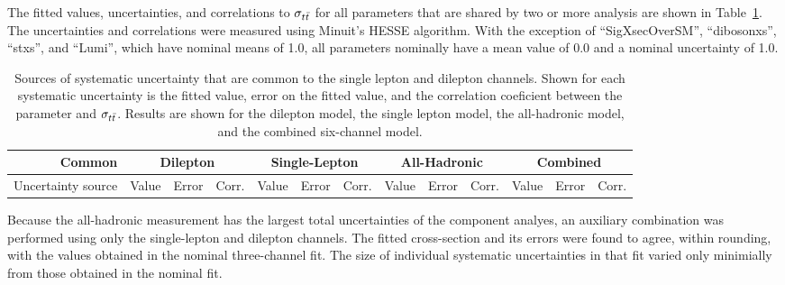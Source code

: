 The fitted values, uncertainties, and correlations to $\sigma_{ t\bar{t} }$ for all parameters that are shared by two or more analysis are shown in Table~\ref{tab:commonFittedParams}.
The uncertainties and correlations were measured using Minuit's HESSE algorithm.
With the exception of ``SigXsecOverSM'', ``dibosonxs'', ``stxs'', and ``Lumi'', which have nominal means of 1.0, all parameters nominally have a mean value of 0.0 and a nominal uncertainty of 1.0.



\begin{table}[htbp]

  \begin{center}  
    \tiny
    \begin{tabular}{|r|ccc|ccc|ccc|ccc|} 
      \hline
      Common & \multicolumn{3}{|c|}{Dilepton}  & \multicolumn{3}{|c|}{Single-Lepton} & \multicolumn{3}{|c|}{All-Hadronic} & \multicolumn{3}{|c|}{Combined} \\
      \hline
      Uncertainty source & Value & Error & Corr. & Value & Error & Corr. & Value & Error & Corr. & Value & Error & Corr. \\
      \hline
      
      \hline
    \end{tabular}
  \end{center}
  \caption{ \label{tab:commonFittedParams} Sources of systematic uncertainty that are common to the single lepton and dilepton channels.  Shown for each systematic uncertainty is the fitted value, error on the fitted value, and the correlation coeficient between the parameter and $\sigma_{t\bar{t}}$.  Results are shown for the dilepton model, the single lepton model, the all-hadronic model, and the combined six-channel model. }
\end{table}

Because the all-hadronic measurement has the largest total uncertainties of the component analyes, an auxiliary combination was performed using only the single-lepton and dilepton channels.
The fitted cross-section and its errors were found to agree, within rounding, with the values obtained in the nominal three-channel fit.
The size of individual systematic uncertainties in that fit varied only minimially from those obtained in the nominal fit.


